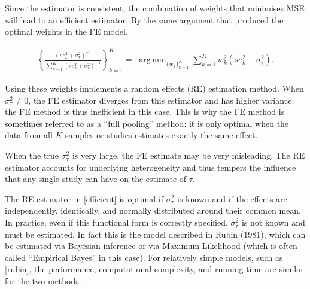 \documentclass[12pt]{article}
\DeclareMathOperator*{\argmin}{arg\,min}
\begin{document}
Since the estimator is consistent, the combination of weights that minimises MSE will lead to an efficient estimator. By the same argument that produced the optimal weights in the FE model, 

 \begin{equation}\label{efficient}
\begin{aligned}
\left\{ \frac{(se^2_k+ \sigma^2_{\tau})^{-1}}{\sum_{k=1}^K(se^2_k+ \sigma^2_{\tau})^{-1}} \right\}_{k=1}^K = \; \argmin_{ \{w_k\}_{k=1}^K  } \sum_{k=1}^{K} w_k^2 (se^2_{k}+ \sigma^2_{\tau}).
\end{aligned}
\end{equation}

Using these weights implements a random effects (RE) estimation method. When $\sigma^2_{\tau} \neq 0$, the FE estimator diverges from this estimator and has higher variance: the FE method is thus inefficient in this case. This is why the FE method is sometimes referred to as a ``full pooling'' method: it is only optimal when the data from all $K$ samples or studies estimates exactly the same effect. 

When the true $\sigma^2_{\tau}$ is very large, the FE estimate may be very misleading. 
The RE estimator accounts for underlying heterogeneity and thus tempers the influence that any single study can have on the estimate of $\tau$.

The RE estimator in \eqref{efficient} is optimal if $\sigma^2_{\tau}$ is known and if the effects are independently, identically, and normally distributed around their common mean. 
In practice, even if this functional form is correctly specified, $\sigma^2_{\tau}$ is not known and must be estimated. In fact this is the model described in Rubin (1981), which can be estimated via Bayesian inference or via Maximum Likelihood (which is often called ``Empirical Bayes'' in this case). For relatively simple models, such as \eqref{rubin}, the performance, computational complexity, and running time are similar for the two methods. 
\end{document}
